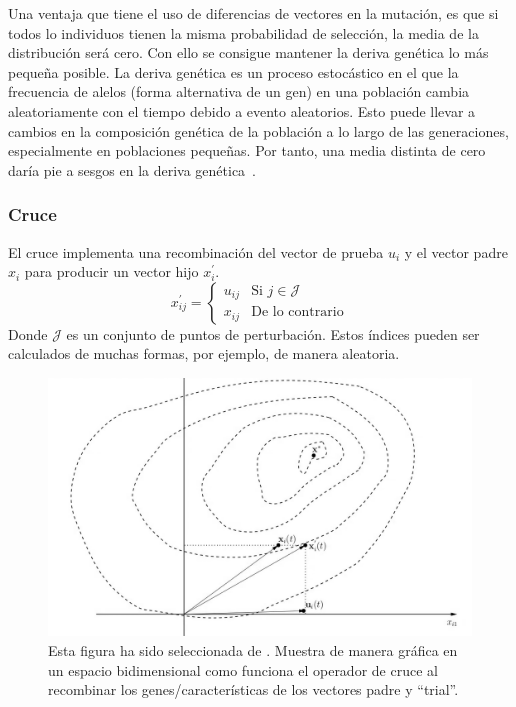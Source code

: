 Una ventaja que tiene el uso de diferencias de vectores en la mutación, es que si todos lo individuos tienen la misma probabilidad de selección, la media de la distribución será cero. Con ello se consigue mantener la deriva genética lo más pequeña posible. La deriva genética es un proceso estocástico en el que la frecuencia de alelos (forma alternativa de un gen) en una población cambia aleatoriamente con el tiempo debido a evento aleatorios. Esto puede llevar a cambios en la composición genética de la población a lo largo de las generaciones, especialmente en poblaciones pequeñas. Por tanto, una media distinta de cero daría pie a sesgos en la deriva genética~\cite{genetic-drift, 10.5555/1557464}.

\subsubsection{Cruce}
El cruce implementa una recombinación del vector de prueba $u_i$ y el vector padre $x_i$ para producir un vector hijo $x^\prime_i$.
\begin{equation}
    x^\prime_{ij}=\begin{cases} u_{ij} & \text{Si $j\in \mathcal{J}$} \\ x_{ij} & \text{De lo contrario} \end{cases}
\end{equation}
Donde $\mathcal{J}$ es un conjunto de puntos de perturbación. Estos índices pueden ser calculados de muchas formas, por ejemplo, de manera aleatoria.

\begin{figure}[htp]
    \begin{center}
        \includegraphics[width=1\textwidth]{imagenes/de-crossover.png}
    \end{center}
    \caption[Crossover en DE]{Esta figura ha sido seleccionada de \cite{10.5555/1557464}. Muestra de manera gráfica en un espacio bidimensional como funciona el operador de cruce al recombinar los genes/características de los vectores padre y ``trial''.}
\end{figure}

